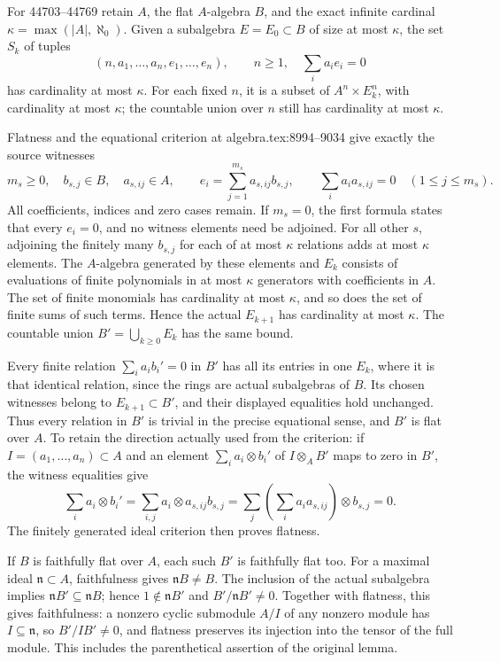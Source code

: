 For 44703--44769 retain \(A\), the flat \(A\)-algebra \(B\), and the exact infinite cardinal \(\kappa=\max(|A|,\aleph_0)\). Given a subalgebra \(E=E_0\subset B\) of size at most \(\kappa\), the set \(S_k\) of tuples \[
 (n,a_1,\ldots,a_n,e_1,\ldots,e_n),\qquad
 n\geq1,\quad \sum_i a_ie_i=0
\] has cardinality at most \(\kappa\). For each fixed \(n\), it is a subset of \(A^n\times E_k^n\), with cardinality at most \(\kappa\); the countable union over \(n\) still has cardinality at most \(\kappa\).

Flatness and the equational criterion at algebra.tex:8994--9034 give exactly the source witnesses \[
 m_s\geq0,\quad b_{s,j}\in B,\quad a_{s,ij}\in A,\qquad
 e_i=\sum_{j=1}^{m_s}a_{s,ij}b_{s,j},\qquad
 \sum_i a_i a_{s,ij}=0\quad(1\leq j\leq m_s).
\] All coefficients, indices and zero cases remain. If \(m_s=0\), the first formula states that every \(e_i=0\), and no witness elements need be adjoined. For all other \(s\), adjoining the finitely many \(b_{s,j}\) for each of at most \(\kappa\) relations adds at most \(\kappa\) elements. The \(A\)-algebra generated by these elements and \(E_k\) consists of evaluations of finite polynomials in at most \(\kappa\) generators with coefficients in \(A\). The set of finite monomials has cardinality at most \(\kappa\), and so does the set of finite sums of such terms. Hence the actual \(E_{k+1}\) has cardinality at most \(\kappa\). The countable union \(B'=\bigcup_{k\geq0}E_k\) has the same bound.

Every finite relation \(\sum_i a_i b_i'=0\) in \(B'\) has all its entries in one \(E_k\), where it is that identical relation, since the rings are actual subalgebras of \(B\). Its chosen witnesses belong to \(E_{k+1}\subset B'\), and their displayed equalities hold unchanged. Thus every relation in \(B'\) is trivial in the precise equational sense, and \(B'\) is flat over \(A\). To retain the direction actually used from the criterion: if \(I=(a_1,\ldots,a_n)\subset A\) and an element \(\sum_i a_i\otimes b_i'\) of \(I\otimes_A B'\) maps to zero in \(B'\), the witness equalities give \[
 \sum_i a_i\otimes b_i'
 =\sum_{i,j}a_i\otimes a_{s,ij}b_{s,j}
 =\sum_j\left(\sum_i a_i a_{s,ij}\right)\otimes b_{s,j}
 =0.
\] The finitely generated ideal criterion then proves flatness.

If \(B\) is faithfully flat over \(A\), each such \(B'\) is faithfully flat too. For a maximal ideal \(\mathfrak n\subset A\), faithfulness gives \(\mathfrak nB\ne B\). The inclusion of the actual subalgebra implies \(\mathfrak nB'\subseteq\mathfrak nB\); hence \(1\notin\mathfrak nB'\) and \(B'/\mathfrak nB'\ne0\). Together with flatness, this gives faithfulness: a nonzero cyclic submodule \(A/I\) of any nonzero module has \(I\subseteq\mathfrak n\), so \(B'/IB'\ne0\), and flatness preserves its injection into the tensor of the full module. This includes the parenthetical assertion of the original lemma.

